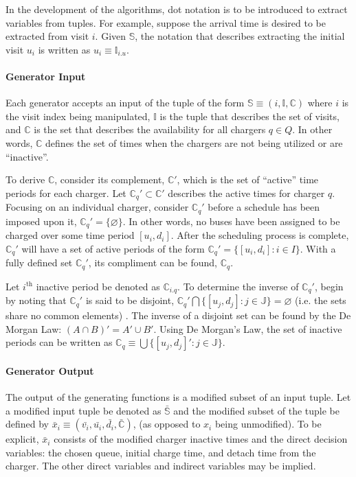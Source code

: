 \documentclass[11pt,a4paper,final]{article}
\newcommand{\I}{\mathbb{I}}                 %
\newcommand{\C}{\mathbb{C}}                 %
\newcommand{\Sol}{\mathbb{S}}               %
\newcommand{\Qset}{Q}                       %
\newcommand{\Jsetq}{\mathbb{J}}             %
\begin{document}
In the development of the algorithms, dot notation is to be introduced to extract variables from tuples. For example,
suppose the arrival time is desired to be extracted from visit \(i\). Given \(\Sol\), the notation that describes extracting
the initial visit \(u_i\) is written as \(u_i \equiv \I_{i.u}\).

\paragraph{Generator Input}
\label{sec:org9a05cbc}
Each generator accepts an input of the tuple of the form \(\Sol \equiv (i, \I, \C)\) where \(i\) is the visit index being
manipulated, \(\I\) is the tuple that describes the set of visits, and \(\C\) is the set that describes the availability for
all chargers \(q \in \Qset\). In other words, \(\C\) defines the set of times when the chargers are not being utilized or are
``inactive''.

To derive \(\C\), consider its complement, \(\C'\), which is the set of ``active'' time periods for each charger. Let \(\C_q' \subset
\C'\) describes the active times for charger \(q\). Focusing on an individual charger, consider \(\C_q'\) before a schedule
has been imposed upon it, \(\C_q' = \{ \varnothing \}\). In other words, no buses have been assigned to be charged over
some time period \([u_i, d_i]\). After the scheduling process is complete, \(\C_q'\) will have a set of active periods of
the form \(\C_q' = \{[u_i, d_i]: i \in I\}\). With a fully defined set \(\C_q'\), its compliment can be found, \(\C_q\).

Let \(i^{\text{th}}\) inactive period be denoted as \(\C_{i.q}\). To determine the inverse of \(\C_q'\), begin by noting that
\(\C_q'\) is said to be disjoint, \(\C_q' \bigcap \{[u_j, d_j] : j \in \Jsetq\} = \varnothing\) (i.e. the sets share no common
elements) \cite{halmos-1974-naive-set-theor}. The inverse of a disjoint set can be found by the De Morgan Law: \((A \cap
B)' = A' \cup B'\). Using De Morgan's Law, the set of inactive periods can be written as \(\C_q \equiv \bigcup \{[u_j, d_j]': j \in
\Jsetq\}\).

\paragraph{Generator Output}
\label{sec:org4bfc26f}
The output of the generating functions is a modified subset of an input tuple. Let a modified input tuple be denoted as
\(\bar{\Sol}\) and the modified subset of the tuple be defined by \(\bar{x}_i \equiv (\bar{v_i}, \bar{u_i}, \bar{d_i},
\bar{\C})\), (as opposed to \(x_i\) being unmodified). To be explicit, \(\bar{x}_i\) consists of the modified charger
inactive times and the direct decision variables: the chosen queue, initial charge time, and detach time from the
charger. The other direct variables and indirect variables may be implied.
\end{document}

